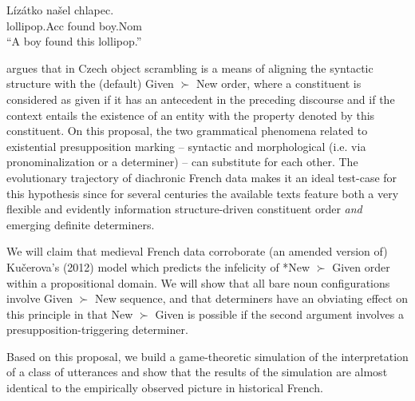 \documentclass[output=paper,modfonts,nonflat]{langsci/langscibook}
\begin{document}
\ea\label{ex:czech2}
\gll L\'{i}z\'{a}tko na\v{s}el chlapec.\\
lollipop.Acc found boy.Nom \\
\glt ``A boy found this lollipop.''
\z



 
\citet{Kucerova:2012} argues that in Czech object scrambling is a means of aligning the syntactic structure with the (default) Given $\succ$ New order, where a constituent is considered as given if it has an antecedent in the preceding discourse and if the context entails the existence of an entity with the property denoted by this constituent. On this proposal, the two grammatical phenomena related to existential presupposition marking -- syntactic and morphological (i.e. via pronominalization or a determiner) -- can substitute for each other. The evolutionary trajectory of diachronic French data makes it an ideal test-case for this hypothesis since for several centuries the available texts feature both a very flexible and evidently information structure-driven constituent order {\itshape and} emerging definite determiners. 

We will claim that medieval French data corroborate (an amended version of) Ku\v{c}erova's (2012) model which predicts the infelicity of *New $\succ$ Given order within a propositional domain. We will show that all bare noun configurations involve Given $\succ$ New sequence, and that determiners have an obviating effect on this principle in that New $\succ$ Given is possible if the second argument involves a presupposition-triggering determiner. 

Based on this proposal, we build a game-theoretic simulation of the interpretation of a class of utterances and show that the results of the simulation are almost identical to the empirically observed picture in historical French. 
\end{document}
